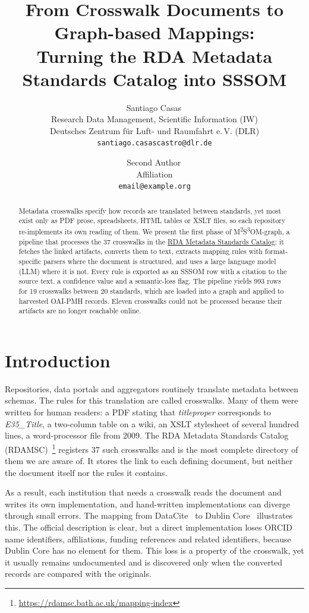 \documentclass[10pt,twocolumn,a4paper]{extarticle}
\title{\vspace{-1.2em}From Crosswalk Documents to Graph-based Mappings:\\
Turning the RDA Metadata Standards Catalog into SSSOM}
\author{%
  Santiago Casas\,\orcidlink{0000-0002-4751-5138}\\
  \small Research Data Management, Scientific Information (IW)\\
  \small Deutsches Zentrum f\"ur Luft- und Raumfahrt e.\,V. (DLR)\\
  \small \texttt{santiago.casascastro@dlr.de}
  \and
  Second Author\,\orcidlink{0000-0000-0000-0000}\\
  \small Affiliation\\
  \small \texttt{email@example.org}
}
\date{}
\newcommand{\mssom}{\texorpdfstring{M\textsuperscript{2}S\textsuperscript{3}OM-graph}{M2S3OM-graph}\xspace}
\begin{document}
\maketitle

\begin{abstract}
Metadata crosswalks specify how records are translated between standards,
yet most exist only as PDF prose, spreadsheets, HTML tables or XSLT files,
so each repository re-implements its own reading of them. We present the
first phase of \mssom, a
pipeline that processes the 37 crosswalks in the \href{https://rdamsc.bath.ac.uk/mapping-index}{RDA Metadata Standards
Catalog}: it fetches the linked artifacts, converts them to text,
extracts mapping rules with format-specific parsers where the document is
structured, and uses a large language model (LLM) where it is not. Every
rule is exported as an SSSOM row with a citation to the source text, a
confidence value and a semantic-loss flag. The pipeline yields 993 rows for
19 crosswalks between 20 standards, which are loaded into a graph and applied to
harvested OAI-PMH records. Eleven crosswalks could not be processed because
their artifacts are no longer reachable online.
\end{abstract}


\section{Introduction}\label{sec:introduction}

Repositories, data portals and aggregators routinely translate metadata
between schemas. The rules for this translation are called crosswalks.
Many of them were written for human readers: a PDF stating that
\emph{titleproper} corresponds to \emph{E35\_Title}, a two-column table on
a wiki, an XSLT stylesheet of several hundred lines, a word-processor file
from 2009. The RDA Metadata Standards Catalog (RDAMSC)~\cite{rdamsc}\footnote{\url{https://rdamsc.bath.ac.uk/mapping-index}}
registers 37 such crosswalks
and is the most complete directory of them we are aware of. It stores the
link to each defining document, but neither the document itself nor the
rules it contains.

As a result, each institution that needs a crosswalk reads the document
and writes its own implementation, and hand-written implementations can
diverge through small errors. The mapping from DataCite~\cite{datacite_schema_4_4}
to Dublin Core~\cite{dcmi_terms_2020} illustrates this. The official
description is clear, but a direct implementation loses ORCID name
identifiers, affiliations, funding references and related identifiers,
because Dublin Core has no element for them. This loss is a property of the
crosswalk, yet it usually remains undocumented and is discovered only when
the converted records are compared with the originals.
\end{document}
